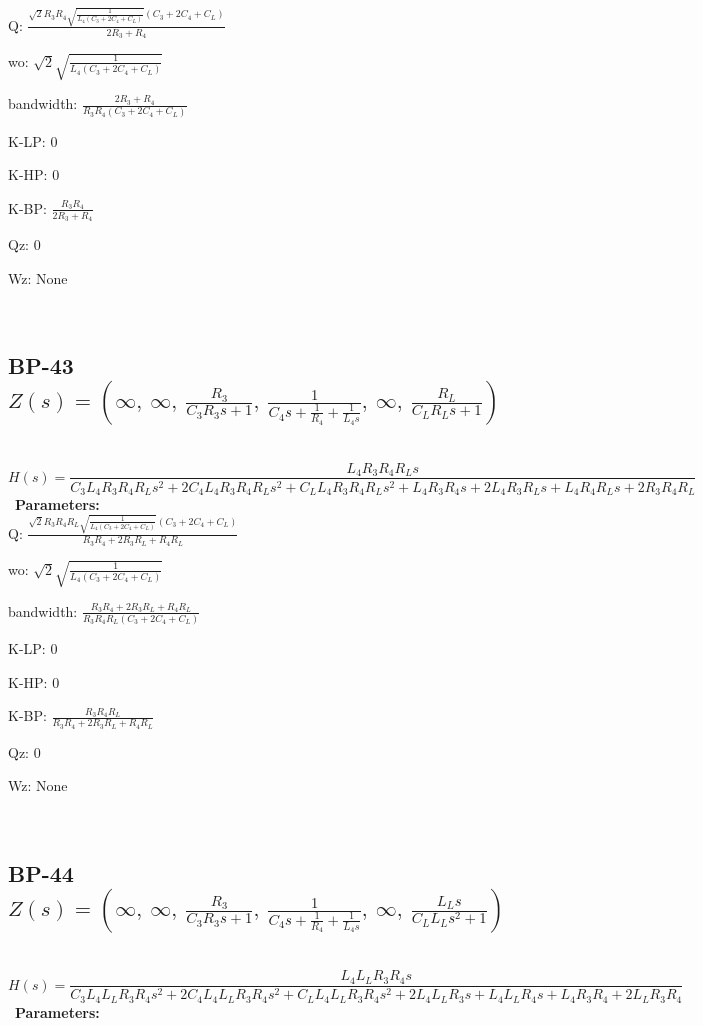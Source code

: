 \documentclass{article}
\begin{document}
Q: $\frac{\sqrt{2} R_{3} R_{4} \sqrt{\frac{1}{L_{4} \left(C_{3} + 2 C_{4} + C_{L}\right)}} \left(C_{3} + 2 C_{4} + C_{L}\right)}{2 R_{3} + R_{4}}$\ 

wo: $\sqrt{2} \sqrt{\frac{1}{L_{4} \left(C_{3} + 2 C_{4} + C_{L}\right)}}$\ 

bandwidth: $\frac{2 R_{3} + R_{4}}{R_{3} R_{4} \left(C_{3} + 2 C_{4} + C_{L}\right)}$\ 

K-LP: $0$\ 

K-HP: $0$\ 

K-BP: $\frac{R_{3} R_{4}}{2 R_{3} + R_{4}}$\ 

Qz: $0$\ 

Wz: $\text{None}$\ 

\ 

\subsection{BP-43 $Z(s) = \left( \infty, \  \infty, \  \frac{R_{3}}{C_{3} R_{3} s + 1}, \  \frac{1}{C_{4} s + \frac{1}{R_{4}} + \frac{1}{L_{4} s}}, \  \infty, \  \frac{R_{L}}{C_{L} R_{L} s + 1}\right)$ } \ 
\textbf{\[H(s) = \frac{L_{4} R_{3} R_{4} R_{L} s}{C_{3} L_{4} R_{3} R_{4} R_{L} s^{2} + 2 C_{4} L_{4} R_{3} R_{4} R_{L} s^{2} + C_{L} L_{4} R_{3} R_{4} R_{L} s^{2} + L_{4} R_{3} R_{4} s + 2 L_{4} R_{3} R_{L} s + L_{4} R_{4} R_{L} s + 2 R_{3} R_{4} R_{L}}\] } \ 
\textbf{Parameters:}\\ 

Q: $\frac{\sqrt{2} R_{3} R_{4} R_{L} \sqrt{\frac{1}{L_{4} \left(C_{3} + 2 C_{4} + C_{L}\right)}} \left(C_{3} + 2 C_{4} + C_{L}\right)}{R_{3} R_{4} + 2 R_{3} R_{L} + R_{4} R_{L}}$\ 

wo: $\sqrt{2} \sqrt{\frac{1}{L_{4} \left(C_{3} + 2 C_{4} + C_{L}\right)}}$\ 

bandwidth: $\frac{R_{3} R_{4} + 2 R_{3} R_{L} + R_{4} R_{L}}{R_{3} R_{4} R_{L} \left(C_{3} + 2 C_{4} + C_{L}\right)}$\ 

K-LP: $0$\ 

K-HP: $0$\ 

K-BP: $\frac{R_{3} R_{4} R_{L}}{R_{3} R_{4} + 2 R_{3} R_{L} + R_{4} R_{L}}$\ 

Qz: $0$\ 

Wz: $\text{None}$\ 

\ 

\subsection{BP-44 $Z(s) = \left( \infty, \  \infty, \  \frac{R_{3}}{C_{3} R_{3} s + 1}, \  \frac{1}{C_{4} s + \frac{1}{R_{4}} + \frac{1}{L_{4} s}}, \  \infty, \  \frac{L_{L} s}{C_{L} L_{L} s^{2} + 1}\right)$ } \ 
\textbf{\[H(s) = \frac{L_{4} L_{L} R_{3} R_{4} s}{C_{3} L_{4} L_{L} R_{3} R_{4} s^{2} + 2 C_{4} L_{4} L_{L} R_{3} R_{4} s^{2} + C_{L} L_{4} L_{L} R_{3} R_{4} s^{2} + 2 L_{4} L_{L} R_{3} s + L_{4} L_{L} R_{4} s + L_{4} R_{3} R_{4} + 2 L_{L} R_{3} R_{4}}\] } \ 
\textbf{Parameters:}\\ 
\end{document}
